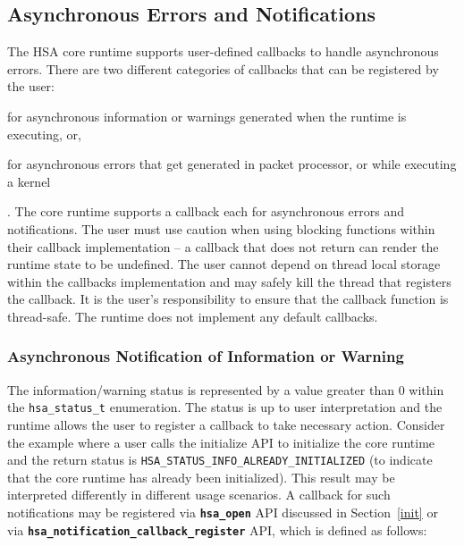 \documentclass{book}
\newcommand{\diffblock}[1]{#1}
\newcommand{\ttbf}[1]{\diffblock{\texttt{\textbf{#1}}}}
\newcommand{\dbtt}[1]{\diffblock{\texttt{#1}}}
\newenvironment{DIFnomarkup}{}{}
\begin{document}
\begin{DIFnomarkup}
\hypertarget{asyncerror}{}\subsection{Asynchronous Errors and
Notifications}\label{asyncerror}
\end{DIFnomarkup}

The HSA core runtime supports user-defined callbacks to handle
asynchronous errors. There are two different categories of callbacks
that can be registered by the user: \begin{inparaenum}[(i)] \item
for asynchronous information or warnings generated when the runtime
is executing, or, \item for asynchronous errors that get generated
in packet processor, or while executing a kernel \end{inparaenum}.
The core runtime supports a callback each for asynchronous errors
and notifications.
The user must use caution when using blocking functions within their
callback implementation -- a callback that does not return can
render the runtime state to be undefined. The user cannot depend on
thread local storage within the callbacks implementation and may
safely kill the thread that registers the callback. It is the user's
responsibility to ensure that the callback function is thread-safe.
The runtime does not implement any default callbacks.

\subsubsection{Asynchronous Notification of Information or
Warning}\label{asynnotif}

The information/warning status is represented by a value greater
than 0 within the \dbtt{hsa\_status\_t} enumeration. The status is
up to user interpretation and the runtime allows the user to
register a callback to take necessary action. Consider the example
where a user calls the initialize API to initialize the core runtime
and the return status is
\dbtt{HSA\_STATUS\_INFO\_ALREADY\_INITIALIZED} (to indicate that
the core runtime has already been initialized). This result may be
interpreted differently in different usage scenarios. A callback for
such notifications may be registered via \ttbf{hsa\_open} API
discussed in Section~\ref{init} or via
\ttbf{hsa\_notification\_callback\_register} API, which is defined
as follows:
\end{document}
